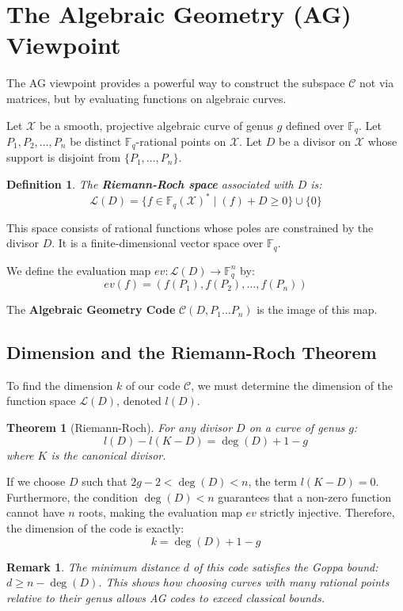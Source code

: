 \documentclass[11pt, a4paper]{article}
\newtheorem{definition}{Definition}
\newtheorem{theorem}{Theorem}
\newtheorem{remark}{Remark}
\newcommand{\F}{\mathbb{F}}
\newcommand{\C}{\mathcal{C}}
\newcommand{\X}{\mathcal{X}}
\newcommand{\cL}{\mathcal{L}}
\begin{document}
	\section{The Algebraic Geometry (AG) Viewpoint}
	
	The AG viewpoint provides a powerful way to construct the subspace $\C$ not via matrices, but by evaluating functions on algebraic curves. 
	
	Let $\X$ be a smooth, projective algebraic curve of genus $g$ defined over $\F_q$. Let $P_1, P_2, \dots, P_n$ be distinct $\F_q$-rational points on $\X$. Let $D$ be a divisor on $\X$ whose support is disjoint from $\{P_1, \dots, P_n\}$.
	
	\begin{definition}
		The \textbf{Riemann-Roch space} associated with $D$ is:
		$$ \cL(D) = \{ f \in \F_q(\X)^* \mid (f) + D \geq 0 \} \cup \{0\} $$
	\end{definition}
	This space consists of rational functions whose poles are constrained by the divisor $D$. It is a finite-dimensional vector space over $\F_q$.
	
	We define the evaluation map $ev: \cL(D) \to \F_q^n$ by:
	$$ ev(f) = (f(P_1), f(P_2), \dots, f(P_n)) $$
	
	The \textbf{Algebraic Geometry Code} $\C(D, P_1\dots P_n)$ is the image of this map.
	
	\subsection{Dimension and the Riemann-Roch Theorem}
	
	To find the dimension $k$ of our code $\C$, we must determine the dimension of the function space $\cL(D)$, denoted $l(D)$. 
	\begin{theorem}[Riemann-Roch]
		For any divisor $D$ on a curve of genus $g$:
		$$ l(D) - l(K - D) = \deg(D) + 1 - g $$
		where $K$ is the canonical divisor.
	\end{theorem}
	
	If we choose $D$ such that $2g - 2 < \deg(D) < n$, the term $l(K-D) = 0$. Furthermore, the condition $\deg(D) < n$ guarantees that a non-zero function cannot have $n$ roots, making the evaluation map $ev$ strictly injective. Therefore, the dimension of the code is exactly:
	$$ k = \deg(D) + 1 - g $$
	
	\begin{remark}
		The minimum distance $d$ of this code satisfies the Goppa bound: $d \geq n - \deg(D)$. This shows how choosing curves with many rational points relative to their genus allows AG codes to exceed classical bounds.
	\end{remark}
	
\end{document}

